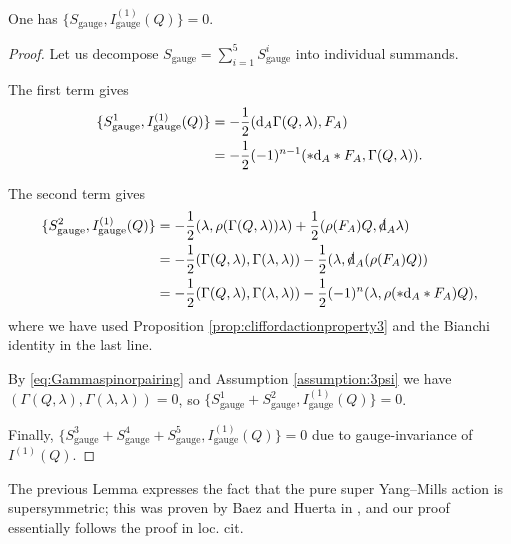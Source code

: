 \documentclass[10pt, oneside]{article}
\newcommand{\gauge}{\mathrm{gauge}}
\begin{document}
\begin{lemma}
One has $\{S_{\gauge}, I_{\gauge}^{(1)}(Q)\} = 0$.
\label{lm:gaugemultiplet1}
\end{lemma}
\begin{proof}
Let us decompose $S_{\gauge} = \sum_{i=1}^5 S_{\gauge}^i$ into individual summands.

The first term gives
\begin{align*}
\{S_{\gauge}^1, I_{\gauge}^{(1)}(Q)\} &= -\frac{1}{2} (\d_A \Gamma(Q, \lambda), F_A)\\
&= -\frac{1}{2}(-1)^{n-1} (\ast \d_A \ast F_A, \Gamma(Q, \lambda)).
\end{align*}

The second term gives
\begin{align*}
\{S_{\gauge}^2, I_{\gauge}^{(1)}(Q)\} &= -\frac{1}{2}(\lambda, \rho(\Gamma(Q, \lambda))\lambda) + \frac{1}{2}(\rho(F_A) Q, \sd{\d}_A\lambda) \\
&= -\frac{1}{2}(\Gamma(Q, \lambda), \Gamma(\lambda, \lambda))  - \frac{1}{2}(\lambda, \sd{\d}_A(\rho(F_A) Q)) \\
&= -\frac{1}{2}(\Gamma(Q, \lambda), \Gamma(\lambda, \lambda)) - \frac{1}{2} (-1)^n (\lambda, \rho(\ast \d_A\ast F_A) Q),
\end{align*}
where we have used Proposition \ref{prop:cliffordactionproperty3} and the Bianchi identity in the last line.

By \eqref{eq:Gammaspinorpairing} and Assumption \ref{assumption:3psi} we have $(\Gamma(Q, \lambda), \Gamma(\lambda, \lambda)) = 0$, so $\{S_{\gauge}^1 + S_{\gauge}^2, I_{\gauge}^{(1)}(Q)\} = 0$.

Finally, $\{S_{\gauge}^3 + S_{\gauge}^4 + S_{\gauge}^5, I_{\gauge}^{(1)}(Q)\} = 0$ due to gauge-invariance of $I^{(1)}(Q)$.
\end{proof}

\begin{remark}
The previous Lemma expresses the fact that the pure super Yang--Mills action is supersymmetric; this was proven by Baez and Huerta in \cite{BaezHuerta}, and our proof essentially follows the proof in loc. cit.
\end{remark}
\end{document}
